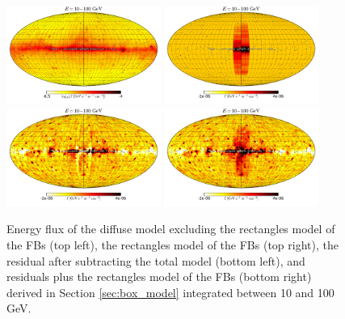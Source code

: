 \begin{figure}[h]
\centering
 \includegraphics[width=0.45\textwidth]{plots/Mollweide_Boxes_model_03-10GeV_flux_source_range_1_log.pdf}
\includegraphics[width=0.45\textwidth]{plots/Mollweide_Boxes_03-10GeV_flux_source_range_1.pdf}\\
\includegraphics[width=0.45\textwidth]{plots/Mollweide_Boxes_residual_03-10GeV_flux_source_range_1.pdf}
 \includegraphics[width=0.45\textwidth]{plots/Mollweide_Boxes_residual+boxes_03-10GeV_flux_source_range_1.pdf}
 \caption{Energy flux of the diffuse model excluding the rectangles model of the FBs (top left),
 the rectangles model of the FBs (top right), 
the residual after subtracting the total model (bottom left),
and residuals plus the rectangles model of the FBs (bottom right)
 derived in Section \ref{sec:box_model}
 integrated between 10 and 100 GeV.}
 \label{fig:Maps_Rectangles}
\end{figure}

